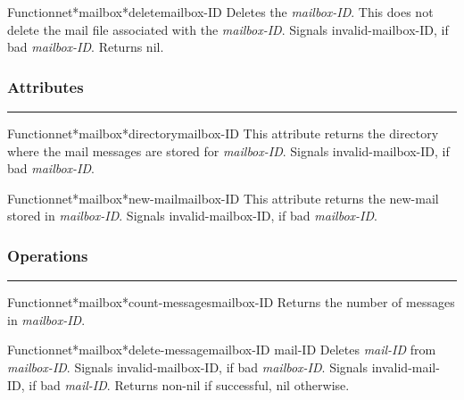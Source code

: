 \begin{functiondoc}{Function}{net*mailbox*delete}{mailbox-ID}
Deletes the {\em mailbox-ID}.  This does not delete the mail file associated
with the {\em mailbox-ID}.
Signals invalid-mailbox-ID, if bad {\em mailbox-ID}.
Returns nil.
\end{functiondoc}


\subsubsection*{Attributes}
\par\vspace*{0.00in}\par\hrule\par\medskip\par


\begin{functiondoc}{Function}{net*mailbox*directory}{mailbox-ID}
This attribute returns the directory where the mail messages
are stored for {\em mailbox-ID}.
Signals invalid-mailbox-ID, if bad {\em mailbox-ID}.
\end{functiondoc}

\begin{functiondoc}{Function}{net*mailbox*new-mail}{mailbox-ID}
This attribute returns the new-mail stored in {\em mailbox-ID}.
Signals invalid-mailbox-ID, if bad {\em mailbox-ID}.
\end{functiondoc}


\subsubsection*{Operations}
\par\vspace*{0.00in}\par\hrule\par\medskip\par


\begin{functiondoc}{Function}{net*mailbox*count-messages}{mailbox-ID}
Returns the number of messages in {\em mailbox-ID}.
\end{functiondoc}

\begin{functiondoc}{Function}{net*mailbox*delete-message}{mailbox-ID mail-ID}
Deletes {\em mail-ID} from {\em mailbox-ID}.
Signals invalid-mailbox-ID, if bad {\em mailbox-ID}.
Signals invalid-mail-ID, if bad {\em mail-ID}.
Returns non-nil if successful, nil otherwise.
\end{functiondoc}

